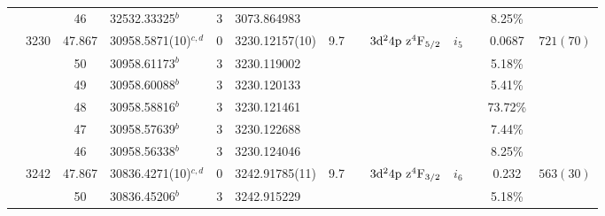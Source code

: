 \begin{table*}
\begin{center}
{\begin{tabular}{:l;l;c;l;c;l;c;l;l;c;c;c;c}
\rowstyle{\itshape}               &        & 46        & 32532.33325$^{b}$                & 3 &   3073.864983      &      & $                                        $ & $                                        $ & $      $ &              & 8.25\%    & $          $\\
                                  & 3230   & 47.867    & 30958.5871(10)$^{c,d}$           & 0 &    3230.12157(10)  &  9.7 & $                                        $ & $3\rm{d}^24\rm{p~z}^4\rm{F}_{5/2}        $ & $i_{5} $ &              & 0.0687    & $  721(70) $\\
\rowstyle{\itshape}               &        & 50        & 30958.61173$^{b}$                & 3 &   3230.119002      &      & $                                        $ & $                                        $ & $      $ &              & 5.18\%    & $          $\\
\rowstyle{\itshape}               &        & 49        & 30958.60088$^{b}$                & 3 &   3230.120133      &      & $                                        $ & $                                        $ & $      $ &              & 5.41\%    & $          $\\
\rowstyle{\itshape}               &        & 48        & 30958.58816$^{b}$                & 3 &   3230.121461      &      & $                                        $ & $                                        $ & $      $ &              & 73.72\%   & $          $\\
\rowstyle{\itshape}               &        & 47        & 30958.57639$^{b}$                & 3 &   3230.122688      &      & $                                        $ & $                                        $ & $      $ &              & 7.44\%    & $          $\\
\rowstyle{\itshape}               &        & 46        & 30958.56338$^{b}$                & 3 &   3230.124046      &      & $                                        $ & $                                        $ & $      $ &              & 8.25\%    & $          $\\
                                  & 3242   & 47.867    & 30836.4271(10)$^{c,d}$           & 0 &    3242.91785(11)  &  9.7 & $                                        $ & $3\rm{d}^24\rm{p~z}^4\rm{F}_{3/2}        $ & $i_{6} $ &              & 0.232     & $  563(30) $\\
\rowstyle{\itshape}               &        & 50        & 30836.45206$^{b}$                & 3 &   3242.915229      &      & $                                        $ & $                                        $ & $      $ &              & 5.18\%    & $          $\\

\end{tabular}}
\end{center}
\end{table*}
